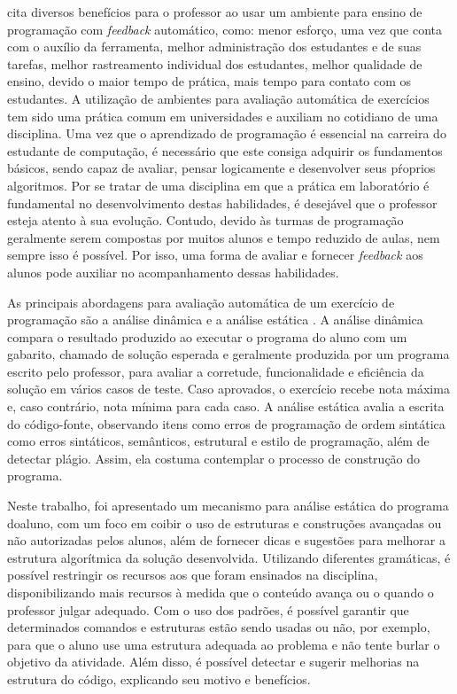 \documentclass[12pt]{article}
\begin{document}
\cite{moreira2009-ambiente-ensino} cita diversos benefícios para o professor ao
usar um ambiente para ensino de programação com \textit{feedback} automático, 
como: menor esforço, uma vez que conta com o auxílio da ferramenta, melhor 
administração dos estudantes e de suas tarefas, melhor rastreamento individual 
dos estudantes, melhor qualidade de ensino, devido o maior tempo de prática, 
mais tempo para contato com os estudantes. A utilização de ambientes para 
avaliação automática de exercícios tem sido uma prática comum em universidades
e auxiliam no cotidiano de uma disciplina. Uma vez que o aprendizado de
programação é essencial na carreira do estudante de computação, é necessário
que este consiga adquirir os fundamentos básicos, sendo capaz de avaliar, pensar
logicamente e desenvolver seus pŕoprios algoritmos. Por se tratar de uma disciplina
em que a prática em laboratório é fundamental no desenvolvimento destas habilidades,
é desejável que o professor esteja atento à sua evolução. Contudo, devido às 
turmas de programação geralmente serem compostas por muitos alunos e tempo 
reduzido de aulas, nem sempre isso é possível. Por isso, uma forma de avaliar e
fornecer \textit{feedback} aos alunos pode auxiliar no acompanhamento dessas
habilidades.

As principais abordagens para avaliação automática de um exercício de programação
são a análise dinâmica e a análise estática \cite{oliveira2015-avaliacao-automatica-programacao}. 
A análise dinâmica compara o resultado produzido ao executar o programa do aluno 
com um gabarito, chamado de solução esperada e geralmente produzida por um 
programa escrito pelo professor, para avaliar a corretude, funcionalidade e
eficiência da solução em vários casos de teste. Caso aprovados, o exercício 
recebe nota máxima e, caso contrário, nota mínima para cada caso.
A análise estática avalia a escrita do código-fonte, observando itens como 
erros de programação de ordem sintática como erros sintáticos, semânticos,
estrutural e estilo de programação, além de detectar plágio. Assim, ela 
costuma contemplar o processo de construção do programa.

Neste trabalho, foi apresentado um mecanismo para análise estática do programa 
doaluno, com um foco em coibir o uso de estruturas e construções avançadas ou 
não autorizadas pelos alunos, além de fornecer dicas e sugestões para melhorar
a estrutura algorítmica da solução desenvolvida. Utilizando diferentes gramáticas,
é possível restringir os recursos aos que foram ensinados na disciplina, 
disponibilizando mais recursos à medida que o conteúdo avança ou o quando o 
professor julgar adequado. Com o uso dos padrões, é possível garantir que 
determinados comandos e estruturas estão sendo usadas ou não, por exemplo,
para que o aluno use uma estrutura adequada ao problema e não tente burlar o
objetivo da atividade. Além disso, é possível detectar e sugerir melhorias
na estrutura do código, explicando seu motivo e benefícios.
\end{document}
